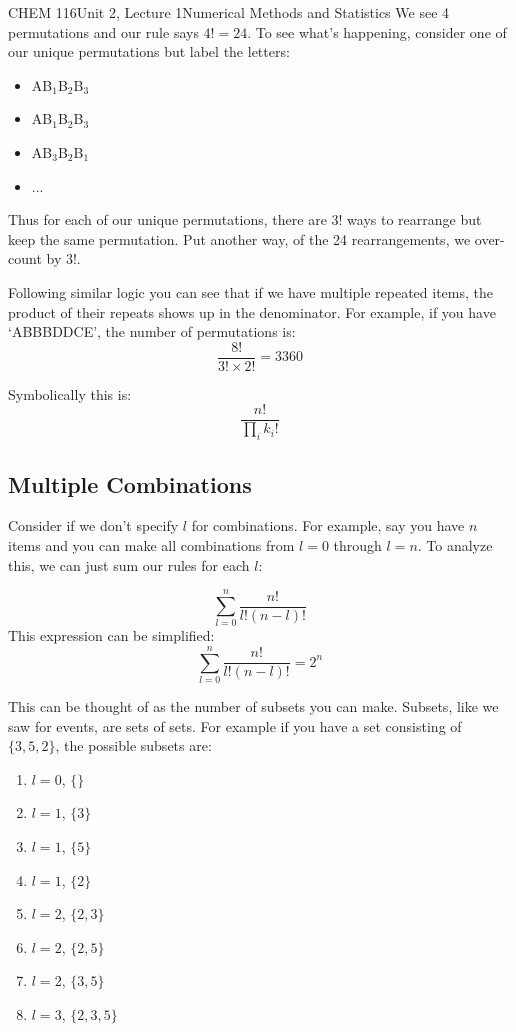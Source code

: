 \documentclass{article}
\begin{document}
\begin{tdoc}{CHEM 116}{Unit 2, Lecture 1}{Numerical Methods and Statistics}
We see 4 permutations and our rule says $4!=24$. To see what's happening, consider one of our unique permutations but label the letters:
\begin{itemize}
\item AB$_1$B$_2$B$_3$
\item AB$_1$B$_2$B$_3$
\item AB$_3$B$_2$B$_1$
\item ...
\end{itemize}
Thus for each of our unique permutations, there are $3!$ ways to rearrange but keep the same permutation. Put another way, of the 24 rearrangements,
we over-count by $3!$.

Following similar logic you can see that if we have multiple repeated items, the product of their repeats shows up in the denominator. For example, if you have `ABBBDDCE', the number of permutations is:
\[
\frac{8!}{3!\times2!} = 3360  
\]

Symbolically this is:
\begin{equation}
  \frac{n!}{\prod_i k_i!}
\end{equation}

\subsection{Multiple Combinations}
Consider if we don't specify $l$ for combinations. For example, say you have $n$ items and you can make all combinations from $l=0$ through $l=n$. To analyze this, we can just sum our rules for each $l$:

\[
  \sum_{l=0}^n \frac{n!}{l!(n - l)!}  
\]
This expression can be simplified:
\begin{equation}
  \sum_{l=0}^n \frac{n!}{l!(n - l)!} = 2^n
\end{equation}

This can be thought of as the number of subsets you can make. Subsets, like we saw for events, are sets of sets. For example if you have a set consisting of $\{3, 5, 2\}$, the possible subsets are:
\begin{enumerate}
\item $l=0$, $\{\}$
\item $l=1$, $\{3\}$
\item $l=1$, $\{5\}$
\item $l=1$, $\{2\}$
\item $l=2$, $\{2, 3\}$
\item $l=2$, $\{2,5\}$
\item $l=2$, $\{3,5\}$
\item $l=3$, $\{2, 3, 5\}$
\end{enumerate}


\end{tdoc}
\end{document}
